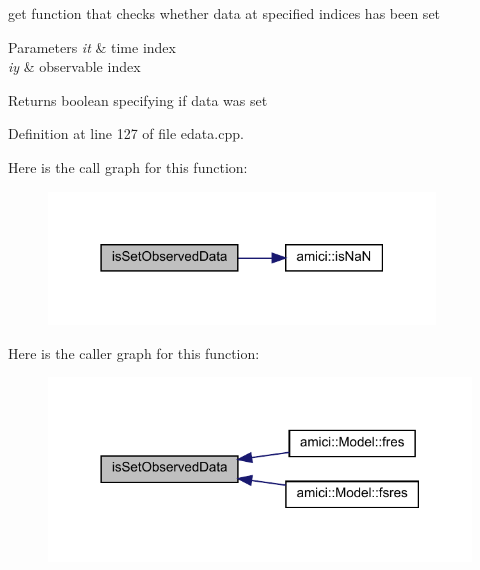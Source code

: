 get function that checks whether data at specified indices has been set


\begin{DoxyParams}{Parameters}
{\em it} & time index \\
\hline
{\em iy} & observable index \\
\hline
\end{DoxyParams}
\begin{DoxyReturn}{Returns}
boolean specifying if data was set 
\end{DoxyReturn}


Definition at line 127 of file edata.\+cpp.

Here is the call graph for this function\+:
\nopagebreak
\begin{figure}[H]
\begin{center}
\leavevmode
\includegraphics[width=291pt]{classamici_1_1_exp_data_aedcda756b6356d6e147f2f4eb7658500_cgraph}
\end{center}
\end{figure}
Here is the caller graph for this function\+:
\nopagebreak
\begin{figure}[H]
\begin{center}
\leavevmode
\includegraphics[width=318pt]{classamici_1_1_exp_data_aedcda756b6356d6e147f2f4eb7658500_icgraph}
\end{center}
\end{figure}
\mbox{\label{classamici_1_1_exp_data_a509b3b8f38e8529dd59c1415dc6b839c}} 
